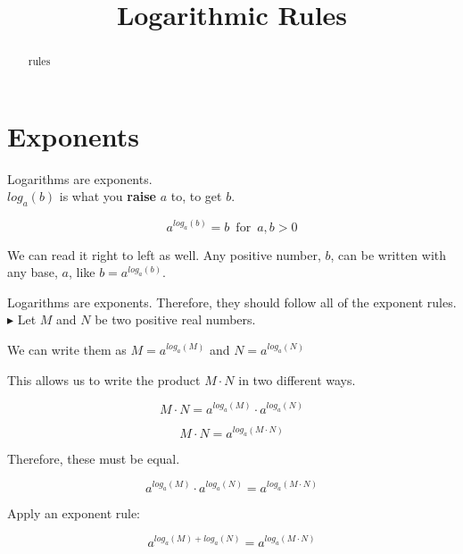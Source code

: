 \documentclass{ximera}
\title{Logarithmic Rules}
\begin{document}
\begin{abstract}
rules
\end{abstract}
\maketitle
















\section{Exponents}

Logarithms are exponents. \\


$log_a(b)$ is what you \textbf{\textcolor{red!90!darkgray}{raise}} $a$ to, to get $b$.

\[    a^{log_a(b)}  = b    \, \text{ for } \,  a,b > 0     \]


We can read it right to left as well.  Any positive number, $b$, can be written with any base, $a$, like $b = a^{log_a(b)}$.






Logarithms are exponents. Therefore, they should follow all of the exponent rules. \\



$\blacktriangleright$  Let $M$ and $N$ be two positive real numbers.

We can write them as $M = a^{log_a(M)}$ and $N = a^{log_a(N)}$


This allows us to write the product $M \cdot N$ in two different ways.



\[   M \cdot N = a^{log_a(M)} \cdot a^{log_a(N)}                    \]

\[   M \cdot N = a^{log_a(M \cdot N)}                  \]


Therefore, these must be equal.


\[    a^{log_a(M)} \cdot a^{log_a(N)}     =   a^{log_a(M \cdot N)}                \]


Apply an exponent rule:


\[    a^{log_a(M)+log_a(N)}    =   a^{log_a(M \cdot N)}                \]
\end{document}
